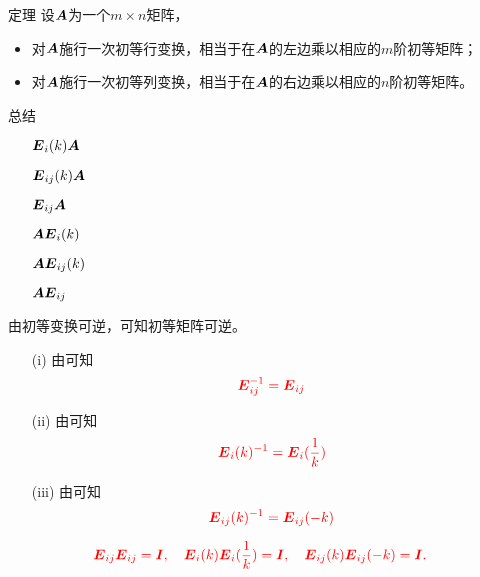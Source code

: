\begin{frame}
  \begin{footnotesize}
    \begin{block}{定理}
      设$\boldsymbol{A}$为一个$m\times n$矩阵，
      \begin{itemize}
      \item 
        对$\boldsymbol{A}$施行一次初等行变换，相当于在$\boldsymbol{A}$的左边乘以相应的$m$阶初等矩阵；\\[0.3cm]
      \item
        对$\boldsymbol{A}$施行一次初等列变换，相当于在$\boldsymbol{A}$的右边乘以相应的$n$阶初等矩阵。
      \end{itemize}
    \end{block}
    \pause
    \vspace{0.1in}
    \begin{block}{总结}
      \begin{itemize}
      \item[] $\boldsymbol{E}_i(k)\boldsymbol{A}$
      \item[] $\boldsymbol{E}_{ij}(k)\boldsymbol{A}$
      \item[] $\boldsymbol{E}_{ij}\boldsymbol{A}$
      \item[] $\boldsymbol{A}\boldsymbol{E}_i(k)$
      \item[] $\boldsymbol{A}\boldsymbol{E}_{ij}(k)$
      \item[] $\boldsymbol{A}\boldsymbol{E}_{ij}$
      \end{itemize}
    \end{block}
    
  \end{footnotesize}
\end{frame}


\begin{frame}
  \begin{footnotesize}
    由初等变换可逆，可知初等矩阵可逆。 \pause 
    \begin{itemize}
    \item[(i)] 由可知
      $$
      \textcolor{red}{\boldsymbol{E}_{ij}^{-1} = \boldsymbol{E}_{ij}}
      $$\pause 
    \item[(ii)] 由可知
      $$
      \textcolor{red}{\boldsymbol{E}_{i}(k)^{-1} = \boldsymbol{E}_{i}(\frac1k)}
      $$\pause 
    \item[(iii)] 由可知
      $$
      \textcolor{red}{\boldsymbol{E}_{ij}(k)^{-1} = \boldsymbol{E}_{ij}(-k)}
      $$ 
    \end{itemize}

    \pause
    \begin{block}{}
    $$ \textcolor{red}{
    \boldsymbol{E}_{ij}\boldsymbol{E}_{ij}=\boldsymbol{I}, \quad
    \boldsymbol{E}_{i}(k)\boldsymbol{E}_{i}(\frac1k) = \boldsymbol{I}, \quad
    \boldsymbol{E}_{ij}(k)\boldsymbol{E}_{ij}(-k) = \boldsymbol{I}.
    }
    $$      
    \end{block}
  \end{footnotesize}
\end{frame}






